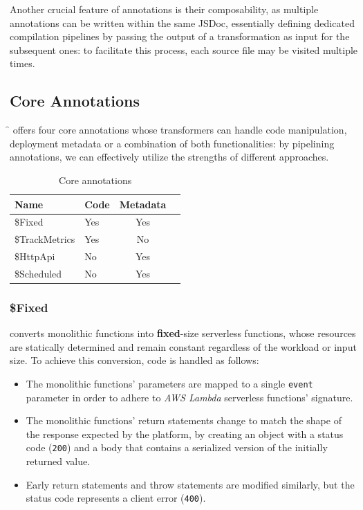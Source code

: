 Another crucial feature of annotations is their composability,
as multiple annotations can be written within the same JSDoc,
essentially defining dedicated compilation pipelines by passing the output
of a transformation as input for the subsequent ones:
to facilitate this process, each source file may be visited multiple times.

\subsection{Core Annotations}

\f{} offers four core annotations whose transformers can handle code manipulation,
deployment metadata or a combination of both functionalities:
by pipelining annotations, we can effectively utilize the strengths of different approaches.

\begin{table}[htbp]
    \centering
    \caption{Core annotations}
    \begin{tabular}{llcc}
        \toprule
        \textbf{Name} & \textbf{Code} & \textbf{Metadata} \\
        \midrule
        \$Fixed & Yes & Yes \\
        \$TrackMetrics & Yes & No \\
        \$HttpApi & No & Yes \\
        \$Scheduled & No & Yes \\
        \bottomrule
    \end{tabular}
\end{table}

\subsubsection{\$Fixed}
converts monolithic functions into \textbf{fixed}-size serverless functions,
whose resources are statically determined and remain constant regardless of the workload or input size.
To achieve this conversion, code is handled as follows:
\begin{itemize}
  \item The monolithic functions' parameters are mapped to a single \verb|event|
    parameter in order to adhere to \textit{AWS Lambda} serverless functions' signature.
  \item The monolithic functions' return statements change to match
    the shape of the response expected by the platform,
    by creating an object with a status code (\verb|200|)
    and a body that contains a serialized version of the initially returned value.
  \item Early return statements and throw statements are modified similarly,
    but the status code represents a client error (\verb|400|).
\end{itemize}

